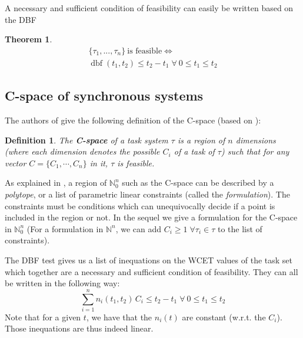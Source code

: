 \documentclass[conference]{IEEEtran}
\newtheorem{theorem}{Theorem}
\newtheorem{definition}{Definition}
\newcommand{\dbf}[1]{\operatorname{dbf}(#1)}
\begin{document}
		A necessary and sufficient condition of feasibility can easily be written
		based on the DBF \cite{baruah1999generalized}

		\begin{theorem}
			\begin{equation}
				\begin{array}{c}
					\{\tau_1, ..., \tau_n\} \: \text{is feasible}  \iff \\
					\dbf{t_1, t_2} \leq t_2 - t_1 \; \forall \: 0 \leq t_1 \leq t_2
				\end{array}
			\end{equation}
		\end{theorem}

	\subsection{C-space of synchronous systems}
	\label{sct:cspaceDescr}


			The authors of \cite{george2009characterization} give the following definition of the C-space (based on \cite{bini2004schedulability}):
			\begin{definition}
				The \textbf{C-space} of a task system $\tau$ is a region of $n$ dimensions (where each dimension denotes the possible $C_i$ of a task of $\tau$) such that for any vector $C = \{ C_1, \cdots, C_{n}\}$ in it, $\tau$ is feasible.
			\end{definition}

			As explained in \cite{nemhauser1988integer}, a region of $\mathbb{N}_0^n$
			such as the C-space can be described by a \emph{polytope}, or a list of
			parametric linear constraints (called the \emph{formulation}). The
			constraints must be conditions which can unequivocally decide if a point is
			included in the region or not. In the sequel we give a formulation for the
			C-space in $\mathbb{N}_0^n$ (For a formulation in $\mathbb{N}^n$, we can add
			$C_i \geqslant 1 \; \forall \tau_i \in \tau$ to the list of constraints).

		The DBF test gives us a list of inequations on the WCET values of the task set
		which together are a necessary and sufficient condition of feasibility. They
		can all be written in the following way:
		\begin{equation}
			\sum_{i=1}^{n} n_i(t_1, t_2) \, C_i \leq t_2 - t_1 \; \forall \: 0 \leq t_1 \leq t_2
		\end{equation}
		Note that for a given $t$, we have that the $n_i(t)$ are
		constant (w.r.t. the $C_i$). Those inequations are thus indeed linear.
\end{document}
